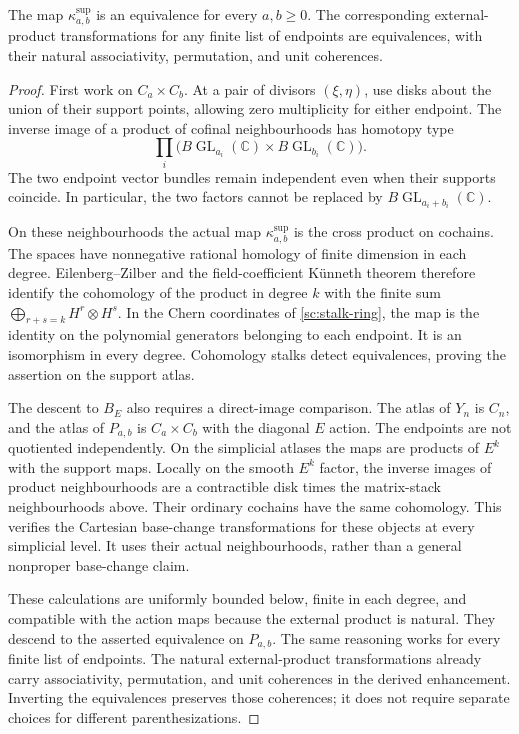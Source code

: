 \begin{theorem}\label{sc:external-product}
The map $\kappa^{\mathrm{sup}}_{a,b}$ is an equivalence for every
$a,b\geq0$. The corresponding external-product transformations for
any finite list of endpoints are equivalences, with their natural
associativity, permutation, and unit coherences.
\end{theorem}
\begin{proof}
First work on $C_a\times C_b$. At a pair of divisors $(\xi,\eta)$,
use disks about the union of their support points, allowing zero
multiplicity for either endpoint. The inverse image of a product of
cofinal neighbourhoods has homotopy type
\[
 \prod_i\bigl(B\operatorname{GL}_{a_i}(\mathbb C)
                    \times B\operatorname{GL}_{b_i}(\mathbb C)\bigr).
\]
The two endpoint vector bundles remain independent even when their
supports coincide. In particular, the two factors cannot be replaced
by $B\operatorname{GL}_{a_i+b_i}(\mathbb C)$.

On these neighbourhoods the actual map
$\kappa^{\mathrm{sup}}_{a,b}$ is the cross product on cochains.
The spaces have nonnegative rational homology of finite dimension
in each degree. Eilenberg--Zilber and the field-coefficient
K\"unneth theorem therefore identify the cohomology of the product
in degree $k$ with the finite sum
$\bigoplus_{r+s=k}H^r\otimes H^s$.
In the Chern coordinates of \eqref{sc:stalk-ring}, the map is the
identity on the polynomial generators belonging to each endpoint.
It is an isomorphism in every degree. Cohomology stalks detect
equivalences, proving the assertion on the support atlas.

The descent to $B_E$ also requires a direct-image comparison.
The atlas of $Y_n$ is $C_n$, and the atlas of $P_{a,b}$ is
$C_a\times C_b$ with the diagonal $E$ action. The endpoints are
not quotiented independently. On the simplicial atlases the maps
are products of $E^k$ with the support maps. Locally on the smooth
$E^k$ factor, the inverse images of product neighbourhoods are a
contractible disk times the matrix-stack neighbourhoods above.
Their ordinary cochains have the same cohomology. This verifies
the Cartesian base-change transformations for these objects at
every simplicial level. It uses their actual neighbourhoods,
rather than a general nonproper base-change claim.

These calculations are uniformly bounded below, finite in each
degree, and compatible with the action maps because the external
product is natural. They descend to the asserted equivalence on
$P_{a,b}$. The same reasoning works for every finite list of
endpoints. The natural external-product transformations already
carry associativity, permutation, and unit coherences in the
derived enhancement. Inverting the equivalences preserves those
coherences; it does not require separate choices for different
parenthesizations.
\end{proof}

